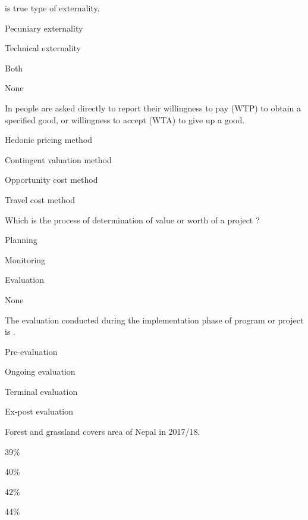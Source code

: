 \begin{questions}
\question \fillin[][3cm] is true type of externality.
\begin{items}
\item Pecuniary externality
\item Technical externality
\item Both
\item None
\end{items}

\question In \fillin[][3cm] people are asked directly to report their willingness to pay (WTP) to obtain a specified good, or willingness to accept (WTA) to give up a good.
\begin{items}
\item Hedonic pricing method
\item Contingent valuation method
\item Opportunity cost method
\item Travel cost method
\end{items}

\question Which is the process of determination of value or worth of a project ?
\begin{items}
\item Planning
\item Monitoring
\item Evaluation
\item None
\end{items}

\question The evaluation conducted during the implementation phase of program or project is \fillin[][3cm].
\begin{items}
\item Pre-evaluation
\item Ongoing evaluation
\item Terminal evaluation
\item Ex-post evaluation
\end{items}

\question Forest and grassland covers \fillin[][3cm] area of Nepal in 2017/18.
\begin{items}
\item 39\%
\item 40\%
\item 42\%
\item 44\%
\end{items}

\end{questions}

